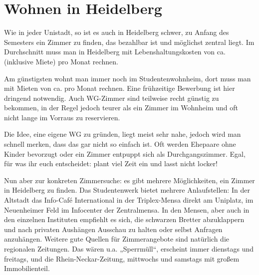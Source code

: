 \section{Wohnen in Heidelberg}


Wie in jeder Unistadt, so ist es auch in Heidelberg schwer, zu Anfang des Semesters ein Zimmer zu finden, das bezahlbar ist und möglichst zentral liegt. Im Durchschnitt muss man in Heidelberg mit Lebenshaltungskosten von ca.  (inklusive Miete) pro Monat rechnen.

Am günstigsten wohnt man immer noch im Studentenwohnheim, dort muss man mit Mieten von ca.  pro Monat rechnen. Eine frühzeitige Bewerbung ist hier dringend notwendig. Auch WG-Zimmer sind teilweise recht günstig zu bekommen, in der Regel jedoch teurer als ein Zimmer im Wohnheim und oft nicht lange im Vorraus zu reservieren.

Die Idee, eine eigene WG zu gründen, liegt meist sehr nahe, jedoch wird man schnell merken, dass das gar nicht so einfach ist. Oft werden Ehepaare ohne Kinder bevorzugt oder ein Zimmer entpuppt sich als Durchgangszimmer. Egal, für was ihr euch entscheidet: plant viel Zeit ein und lasst nicht locker!

Nun aber zur konkreten Zimmersuche: es gibt mehrere Möglichkeiten, ein Zimmer in Heidelberg zu finden. Das Studentenwerk bietet mehrere Anlaufstellen: In der Altstadt das Info-Café International in der Triplex-Mensa direkt am Uniplatz, im Neuenheimer Feld im Infocenter der Zentralmensa. In den Mensen, aber auch in den einzelnen Instituten empfiehlt es sich, die schwarzen Bretter abzuklappern und nach privaten Aushängen Ausschau zu halten oder selbst Anfragen anzuhängen. Weitere gute Quellen für Zimmerangebote sind natürlich die regionalen Zeitungen. Das wären u.a. „Sperrmüll“, erscheint immer dienstags und freitags, und die Rhein-Neckar-Zeitung, mittwochs und samstags mit großem Immobilienteil. %

